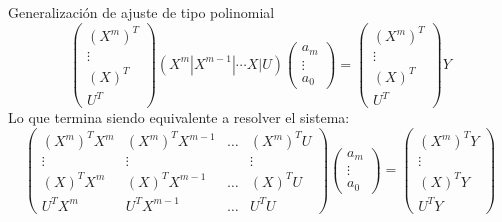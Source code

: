 \begin{frame}{Generalización de ajuste  de tipo polinomial}
\begin{displaymath}
\left(
\begin{array}{c}
(X^m)^T\\
\vdots\\
(X)^T\\
U^T
\end{array}
\right)
(X^m|X^{m-1}|\cdots X|U)
\left(
\begin{array}{c}
a_m\\
\vdots\\
a_0
\end{array}
\right)=
\left(
\begin{array}{c}
(X^m)^T\\
\vdots\\
(X)^T\\
U^T
\end{array}
\right)
Y
\end{displaymath}
Lo que termina siendo equivalente a resolver el sistema:
\begin{displaymath}
\left(
\begin{array}{cccc}
(X^m)^TX^m & (X^m)^TX^{m-1} &\hdots & (X^m)^TU\\
\vdots&\vdots &&\vdots\\
(X)^TX^m&(X)^TX^{m-1}&\hdots &(X)^TU\\
U^TX^m&U^TX^{m-1}&\hdots &U^TU
\end{array}
\right)
\left(
\begin{array}{c}
a_m\\
\vdots\\
a_0
\end{array}
\right)=
\left(
\begin{array}{c}
(X^m)^TY\\
\vdots\\
(X)^TY\\
U^TY
\end{array}
\right)
\end{displaymath}
\end{frame}